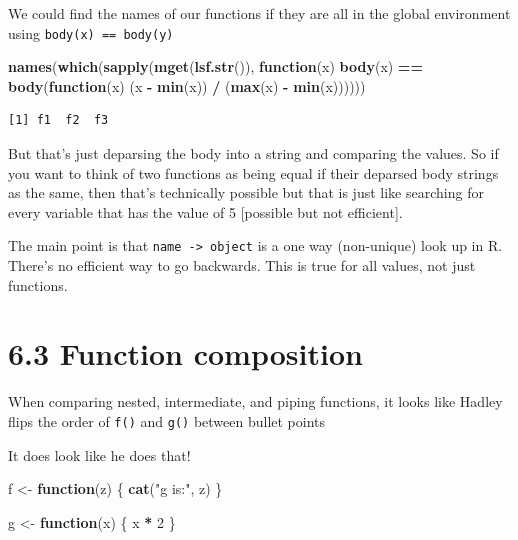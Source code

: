 \documentclass[]{book}
\newenvironment{Shaded}{\begin{snugshade}}{\end{snugshade}}
\newcommand{\ControlFlowTok}[1]{\textcolor[rgb]{0.13,0.29,0.53}{\textbf{#1}}}
\newcommand{\DecValTok}[1]{\textcolor[rgb]{0.00,0.00,0.81}{#1}}
\newcommand{\KeywordTok}[1]{\textcolor[rgb]{0.13,0.29,0.53}{\textbf{#1}}}
\newcommand{\NormalTok}[1]{#1}
\newcommand{\OperatorTok}[1]{\textcolor[rgb]{0.81,0.36,0.00}{\textbf{#1}}}
\newcommand{\StringTok}[1]{\textcolor[rgb]{0.31,0.60,0.02}{#1}}
\begin{document}
We could find the names of our functions if they are all in the global environment using \texttt{body(x)\ ==\ body(y)}

\begin{Shaded}
\begin{Highlighting}[]
\KeywordTok{names}\NormalTok{(}\KeywordTok{which}\NormalTok{(}\KeywordTok{sapply}\NormalTok{(}\KeywordTok{mget}\NormalTok{(}\KeywordTok{lsf.str}\NormalTok{()), }\ControlFlowTok{function}\NormalTok{(x) }\KeywordTok{body}\NormalTok{(x) }\OperatorTok{==}\StringTok{ }\KeywordTok{body}\NormalTok{(}\ControlFlowTok{function}\NormalTok{(x) (x }\OperatorTok{-}\StringTok{ }\KeywordTok{min}\NormalTok{(x)) }\OperatorTok{/}\StringTok{ }\NormalTok{(}\KeywordTok{max}\NormalTok{(x) }\OperatorTok{-}\StringTok{ }\KeywordTok{min}\NormalTok{(x))))))}
\end{Highlighting}
\end{Shaded}

\begin{verbatim}
[1] f1  f2  f3
\end{verbatim}

But that's just deparsing the body into a string and comparing the values. So if you want to think of two functions as being equal if their deparsed body strings as the same, then that's technically possible but that is just like searching for every variable that has the value of 5 {[}possible but not efficient{]}.

The main point is that \texttt{name\ -\textgreater{}\ object} is a one way (non-unique) look up in R. There's no efficient way to go backwards. This is true for all values, not just functions.

\hypertarget{function-composition}{%
\section*{6.3 Function composition}\label{function-composition}}

When comparing nested, intermediate, and piping functions, it looks like Hadley flips the order of \texttt{f()} and \texttt{g()} between bullet points

It does look like he does that!

\begin{Shaded}
\begin{Highlighting}[]
\NormalTok{f <-}\StringTok{ }\ControlFlowTok{function}\NormalTok{(z) \{}
  \KeywordTok{cat}\NormalTok{(}\StringTok{"g is:"}\NormalTok{, z)}
\NormalTok{\}}

\NormalTok{g <-}\StringTok{ }\ControlFlowTok{function}\NormalTok{(x) \{}
\NormalTok{  x }\OperatorTok{*}\StringTok{ }\DecValTok{2}
\NormalTok{\}}
\end{Highlighting}
\end{Shaded}
\end{document}

